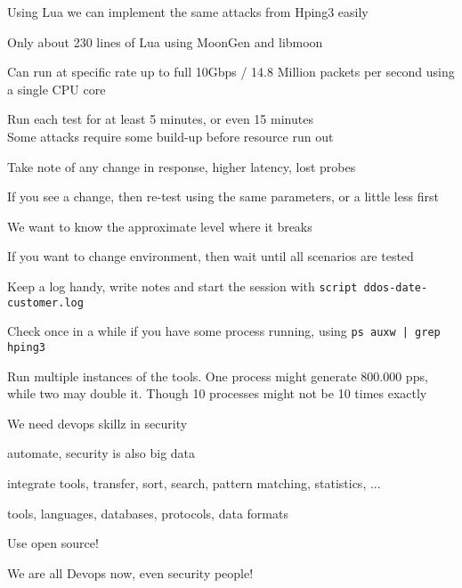 \documentclass[Screen16to9,17pt]{foils}
\begin{document}
\begin{list2}
\item Using Lua we can implement the same attacks from Hping3 easily
\item Only about 230 lines of Lua using MoonGen and libmoon
\item Can run at specific rate up to full 10Gbps / 14.8 Million packets per second using a single CPU core
\end{list2}



\begin{list2}
\item Run each test for at least 5 minutes, or even 15 minutes\\
Some attacks require some build-up before resource run out
\item Take note of any change in response, higher latency, lost probes
\item If you see a change, then re-test using the same parameters, or a little less first
\item We want to know the approximate level where it breaks
\item If you want to change environment, then wait until all scenarios are tested
\item Keep a log handy, write notes and start the session with \verb+script ddos-date-customer.log+
\item Check once in a while if you have some process running, using \verb+ps auxw | grep hping3+
\item Run multiple instances of the tools. One process might generate 800.000 pps, while two may double it. Though 10 processes might not be 10 times exactly
\end{list2}



\begin{list1}
\item We need devops skillz in security
\item automate, security is also big data
\item integrate tools, transfer, sort, search, pattern matching, statistics, ...
\item tools, languages, databases, protocols, data formats
\item Use open source!
\end{list1}

\centerline{We are all Devops now, even security people!}
\end{document}
